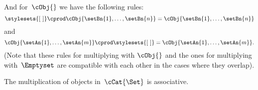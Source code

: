 And for~$\cObj{}$ we have the following rules:
\begin{equation*}
    \stylesets{[ \ ]} \cprod \cObj{\setBn{1}, \dots, \setBn{n}} = \cObj{\setBn{1},  \dots, \setBn{n}}
\end{equation*}
and
\begin{equation*}
    \cObj{\setAn{1}, \dots, \setAn{m}} \cprod \stylesets{[ \ ]} = \cObj{\setAn{1}, \dots, \setAn{m}}.
\end{equation*}
(Note that these rules for multiplying with $\cObj{}$ and the ones for multiplying with~$\Emptyset$ are compatible with each other in the cases where they overlap).

\begin{remark}
    The multiplication of objects in~$\cCat{\Set}$ is associative.
\end{remark}
